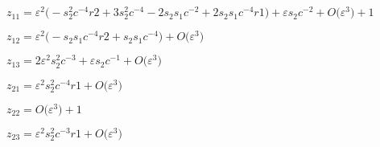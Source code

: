 \documentclass[11pt,a5paper]{article}
\def\eps{\varepsilon}
\begin{document}
\(z_{11}=\eps^{2} \big(-s_{2}^{2} c^{-4} r2+3 s_{2}^{2} c^{-4}-2 s_{2} s_{
1} c^{-2}+2 s_{2} s_{1} c^{-4} r1\big)+\eps s_{2} c^{-2}+O\big(
\varepsilon ^{3}\big)+1
\)\par

\(z_{12}=\eps^{2} \big(-s_{2} s_{1} c^{-4} r2+s_{2} s_{1} c^{-4}\big)+O
\big(\varepsilon ^{3}\big)
\)\par

\(z_{13}=2 \eps^{2} s_{2}^{2} c^{-3}+\eps s_{2} c^{-1}+O\big(\varepsilon 
^{3}\big)
\)\par

\(z_{21}=\eps^{2} s_{2}^{2} c^{-4} r1+O\big(\varepsilon ^{3}\big)
\)\par

\(z_{22}=O\big(\varepsilon ^{3}\big)+1
\)\par

\(z_{23}=\eps^{2} s_{2}^{2} c^{-3} r1+O\big(\varepsilon ^{3}\big)
\)\par

\(
\)\par
\end{document}
